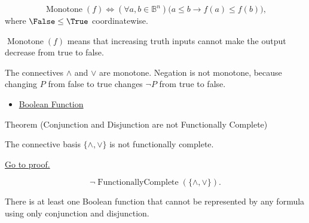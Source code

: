 \begin{remark*}
\[
\operatorname{Monotone}(f)
\Longleftrightarrow
(\forall a,b\in\mathbb{B}^n)
\bigl(a\le b\to f(a)\le f(b)\bigr),
\]
where \(\False\le\True\) coordinatewise.
\end{remark*}

\begin{remark*}
\(\operatorname{Monotone}(f)\) means that increasing truth inputs cannot make the
output decrease from true to false.
\end{remark*}

\begin{remark*}[Interpretation]
The connectives \(\land\) and \(\lor\) are monotone. Negation is not monotone,
because changing \(P\) from false to true changes \(\neg P\) from true to false.
\end{remark*}

\begin{dependencies}
\begin{itemize}
  \item \hyperref[def:boolean-function-propositional-logic]{Boolean Function}
\end{itemize}
\end{dependencies}

\begin{theorembox}{Theorem (Conjunction and Disjunction are not Functionally Complete)}
\begin{theorem}
\label{thm:conjunction-disjunction-not-functionally-complete-propositional-logic}
The connective basis \(\{\land,\lor\}\) is not functionally complete.

\noindent\hyperref[prf:conjunction-disjunction-not-functionally-complete-propositional-logic]{Go to proof.}
\end{theorem}
\end{theorembox}

\begin{remark*}
\[
\neg\operatorname{FunctionallyComplete}(\{\land,\lor\}).
\]
\end{remark*}

\begin{remark*}
There is at least one Boolean function that cannot be represented by any formula
using only conjunction and disjunction.
\end{remark*}

